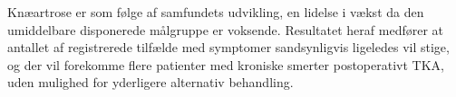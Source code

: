 Knæartrose er som følge af samfundets udvikling, en lidelse i vækst da den umiddelbare disponerede målgruppe er voksende. Resultatet heraf medfører at antallet af registrerede tilfælde med symptomer sandsynligvis ligeledes vil stige, og der vil forekomme flere patienter med kroniske smerter postoperativt TKA, uden mulighed for yderligere alternativ behandling.

